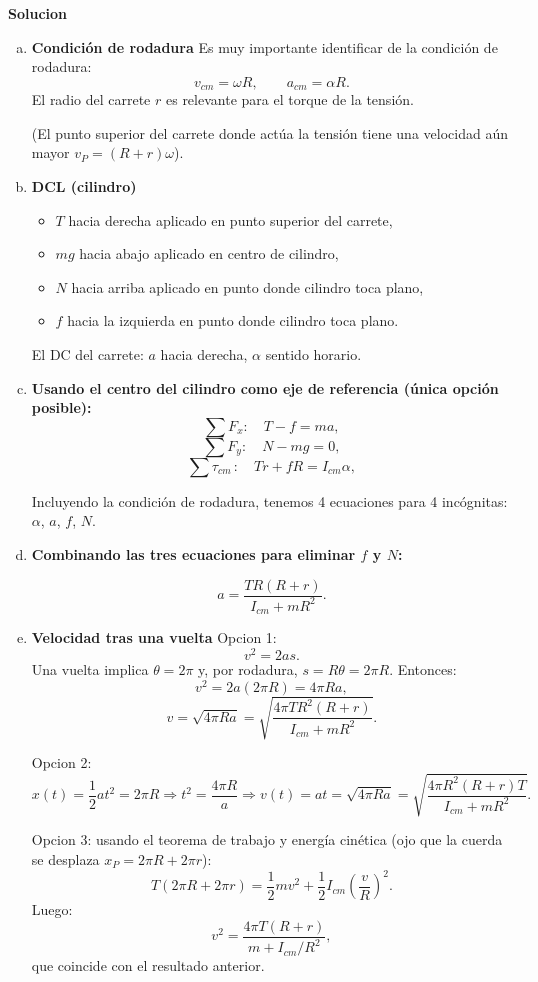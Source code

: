 \vspace{0.2cm}
\textbf{Solucion}
\begin{enumerate}[a)]

    \item \textbf{Condición de rodadura} 
	Es muy importante identificar de la condición de rodadura:
	\[
	v_{cm}=\omega R,
	\qquad
	a_{cm}=\alpha R.
	\]
    El radio del carrete $r$ es relevante para el torque de la tensión.

    (El punto superior del carrete donde actúa la tensión tiene una velocidad aún mayor $v_P=(R+r)\omega$).

	\item \textbf{DCL (cilindro)}

	\begin{itemize}
		\item $T$ hacia derecha aplicado en punto superior del carrete,
		\item $mg$ hacia abajo aplicado en centro de cilindro,
		\item $N$ hacia arriba aplicado en punto donde cilindro toca plano,
		\item $f$ hacia la izquierda en punto donde cilindro toca plano.
	\end{itemize}

	El DC del carrete: $a$ hacia derecha, $\alpha$ sentido horario.

	\item \textbf{Usando el centro del cilindro como eje de referencia (única opción posible):}
	\[
	\sum F_x: \quad T-f=ma,
	\]
	\[
	\sum F_y: \quad N-mg=0,
	\]
	\[
	\sum \tau_{cm}\,: \quad Tr+fR=I_{cm}\alpha,
	\]

	Incluyendo la condición de rodadura, tenemos 4 ecuaciones para 4 incógnitas: $\alpha$, $a$, $f$, $N$.

	\item \textbf{Combinando las tres ecuaciones para eliminar $f$ y $N$:}

	\[
	\boxed{a=\frac{TR(R+r)}{I_{cm}+mR^2}}.
	\]


	\item \textbf{Velocidad tras una vuelta } Opcion 1:
	\[
	v^2=2as.
	\]
	Una vuelta implica $\theta=2\pi$ y, por rodadura, $s=R\theta=2\pi R$. Entonces:
	\[
	v^2=2a(2\pi R)=4\pi Ra,
	\]
	\[
	\boxed{v=\sqrt{4\pi Ra}}=\sqrt{\frac{4\pi T R^2 (R+r)}{I_{cm}+mR^2}}.
	\]

	Opcion 2:
	\[
	x(t)=\frac{1}{2}at^2=2\pi R
	\Rightarrow
	t^2=\frac{4\pi R}{a}
	\Rightarrow
	v(t)=at=\sqrt{4\pi Ra}
	=\sqrt{\frac{4\pi R^2(R+r)T}{I_{cm}+mR^2}}.
	\]

	Opcion 3: usando el teorema de trabajo y energía cinética (ojo que la cuerda se desplaza
	$x_P=2\pi R+2\pi r$):
	\[
	T(2\pi R+2\pi r)=\frac{1}{2}mv^2+\frac{1}{2}I_{cm}\left(\frac{v}{R}\right)^2.
	\]
	Luego:
	\[
	v^2=\frac{4\pi T(R+r)}{m+I_{cm}/R^2},
	\]
	que coincide con el resultado anterior.
    

\end{enumerate}





